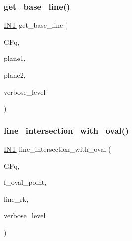 \subsubsection{\texorpdfstring{get\+\_\+base\+\_\+line()}{get\_base\_line()}}
{\footnotesize\ttfamily \mbox{\hyperlink{galois_8h_a09fddde158a3a20bd2dcadb609de11dc}{I\+NT}} get\+\_\+base\+\_\+line (\begin{DoxyParamCaption}\item[{\mbox{\hyperlink{classfinite__field}{finite\+\_\+field}} \&}]{G\+Fq,  }\item[{\mbox{\hyperlink{galois_8h_a09fddde158a3a20bd2dcadb609de11dc}{I\+NT}}}]{plane1,  }\item[{\mbox{\hyperlink{galois_8h_a09fddde158a3a20bd2dcadb609de11dc}{I\+NT}}}]{plane2,  }\item[{\mbox{\hyperlink{galois_8h_a09fddde158a3a20bd2dcadb609de11dc}{I\+NT}}}]{verbose\+\_\+level }\end{DoxyParamCaption})}

\mbox{\label{projective_8_c_a20112068a8d6d2d5ce549b0ddbe67d2a}} 
\subsubsection{\texorpdfstring{line\+\_\+intersection\+\_\+with\+\_\+oval()}{line\_intersection\_with\_oval()}}
{\footnotesize\ttfamily \mbox{\hyperlink{galois_8h_a09fddde158a3a20bd2dcadb609de11dc}{I\+NT}} line\+\_\+intersection\+\_\+with\+\_\+oval (\begin{DoxyParamCaption}\item[{\mbox{\hyperlink{classfinite__field}{finite\+\_\+field}} \&}]{G\+Fq,  }\item[{\mbox{\hyperlink{galois_8h_a09fddde158a3a20bd2dcadb609de11dc}{I\+NT}} $\ast$}]{f\+\_\+oval\+\_\+point,  }\item[{\mbox{\hyperlink{galois_8h_a09fddde158a3a20bd2dcadb609de11dc}{I\+NT}}}]{line\+\_\+rk,  }\item[{\mbox{\hyperlink{galois_8h_a09fddde158a3a20bd2dcadb609de11dc}{I\+NT}}}]{verbose\+\_\+level }\end{DoxyParamCaption})}

\mbox{\label{projective_8_c_ad1230137464939bad39cb193b0f5f904}} 
